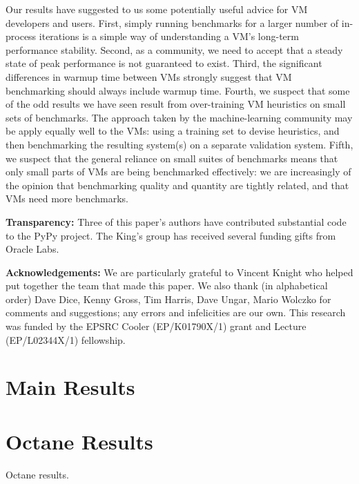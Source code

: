 \documentclass[preprint,numbers,10pt]{sigplanconf}
\begin{document}
Our results have suggested to us some potentially useful advice for VM
developers and users. First, simply running benchmarks for a larger number of
in-process iterations is a simple way of understanding a VM's long-term
performance stability. Second, as a community, we need to accept that a steady
state of peak performance is not guaranteed to exist. Third, the significant
differences in warmup time between VMs strongly suggest that VM benchmarking
should always include warmup time. Fourth, we suspect that some of the odd
results we have seen result from over-training VM heuristics on small sets of
benchmarks. The approach taken by the machine-learning community may be apply
equally well to the VMs: using a training set to devise heuristics, and then
benchmarking the resulting system(s) on a separate validation system. Fifth, we suspect
that the general reliance on small suites of benchmarks means that only
small parts of VMs are being benchmarked effectively: we are increasingly of the
opinion that benchmarking quality and quantity are tightly related, and that VMs
need more benchmarks.

\textbf{Transparency:} Three of this paper's authors have contributed
substantial code to the PyPy project. The King's group has received
several funding gifts from Oracle Labs.

\textbf{Acknowledgements:} We are particularly grateful to Vincent Knight
who helped put together the team that made this paper. We also thank (in alphabetical order) Dave Dice, Kenny
Gross, Tim Harris, Dave Ungar, Mario Wolczko for comments and suggestions; any
errors and infelicities are our own. This research was funded by the EPSRC
Cooler (EP/K01790X/1) grant and Lecture (EP/L02344X/1) fellowship.




\newpage

\appendix

\section{Main Results}
\label{app:mainresults}



\section{Octane Results}

\begin{table}[t]
\centering

\caption{Octane results.}
\label{tab:octane}
\end{table}
\end{document}
